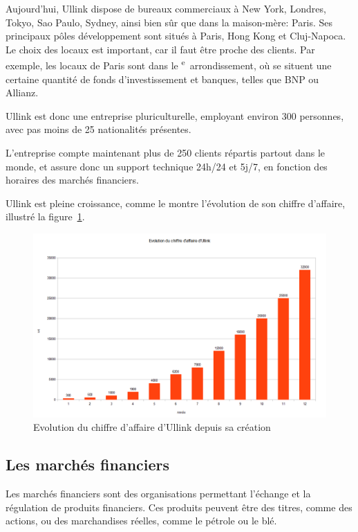 \documentclass[a4paper, 12pt]{article}
\begin{document}
Aujourd'hui, Ullink dispose de bureaux commerciaux à New York, Londres, Tokyo, Sao Paulo, Sydney, ainsi bien sûr que dans la maison-mère: Paris. Ses principaux pôles développement sont situés à Paris, Hong Kong et Cluj-Napoca. Le choix des locaux est important, car il faut être proche des clients. Par exemple, les locaux de Paris sont dans le \textsc{}\textsuperscript{e}~arrondissement, où se situent une certaine quantité de fonds d'investissement et banques, telles que BNP ou Allianz.

Ullink est donc une entreprise pluriculturelle, employant environ 300 personnes, avec pas moins de 25 nationalités présentes.

L'entreprise compte maintenant plus de 250 clients répartis partout dans le monde, et assure donc un support technique 24h/24 et 5j/7, en fonction des horaires des marchés financiers.

Ullink est pleine croissance, comme le montre l'évolution de son chiffre d'affaire, illustré la figure~\ref{ca_ullink}.

\begin{figure}
\includegraphics[width=\textwidth]{ca_ullink.png}
\caption{Evolution du chiffre d'affaire d'Ullink depuis sa création}
\label{ca_ullink}
\end{figure}

\subsection{Les marchés financiers}

Les marchés financiers sont des organisations permettant l'échange et la régulation de produits financiers. Ces produits peuvent être des titres, comme des actions, ou des marchandises réelles, comme le pétrole ou le blé.
\end{document}
